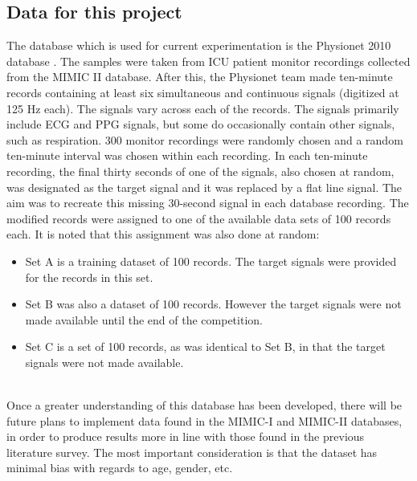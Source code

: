 \documentclass[11pt, a4paper]{article}
\begin{document}
\subsection{Data for this project}
The database which is used for current experimentation is the Physionet 2010 database \cite{challenge2010}. The samples were taken from ICU patient monitor recordings collected from the MIMIC II database. After this, the Physionet team made ten-minute records containing at least six simultaneous and continuous signals (digitized at 125 Hz each). The signals vary across each of the records. The signals primarily include ECG and PPG signals, but some do occasionally contain other signals, such as respiration. 300 monitor recordings were randomly chosen and a random ten-minute interval was chosen within each recording. In each ten-minute recording, the final thirty seconds of one of the signals, also chosen at random, was designated as the target signal and it was replaced by a flat line signal. The aim was to recreate this missing 30-second signal in each database recording. The modified records were assigned to one of the available data sets of 100 records each. It is noted that this assignment was also done at random: \begin{itemize}
    \item Set A is a training dataset of 100 records. The target signals were provided for the records in this set.
    \item  Set B was also a dataset of 100 records. However the target signals were not made available until the end of the competition.
    \item Set C is a set of 100 records, as was identical to Set B, in that the target signals were not made available.
\end{itemize} \\ \newline \noindent Once a greater understanding of this database has been developed, there will be future plans to implement data found in the MIMIC-I and MIMIC-II databases, in order to produce results more in line with those found in the previous literature survey. The most important consideration is that the dataset has minimal bias with regards to age, gender, etc.
\end{document}
